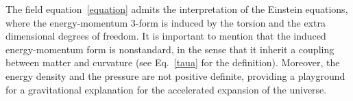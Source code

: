 \documentclass[aps,prd,12pt,superscriptaddress,showpacs,showkeys,reprint,nofootinbib]{revtex4-1}
\begin{document}
The field equation~\eqref{equation} admits the interpretation of the Einstein equations, where the energy-momentum $3$-form is induced by the torsion and the extra dimensional degrees of freedom. It is important to mention that the induced energy-momentum form is nonstandard, in the sense that it inherit a coupling between matter and curvature (see Eq.~\eqref{taua} for the definition). Moreover, the energy density and the pressure are not positive definite, %
providing a playground for a gravitational explanation for the accelerated expansion of the universe.


\end{document}

